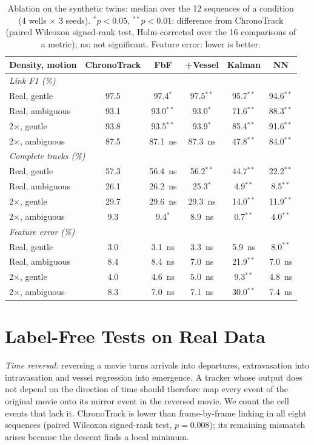 \documentclass[onecolumn,10pt]{IEEEtran}
\begin{document}
\begin{table}[h]
\centering
\caption{Ablation on the synthetic twins: median over the 12 sequences of a condition (4 wells $\times$ 3 seeds). $^{*}p<0.05$, $^{**}p<0.01$: difference from ChronoTrack (paired Wilcoxon signed-rank test, Holm-corrected over the 16 comparisons of a metric); ns: not significant. Feature error: lower is better.}
\label{tab:ablation}
\begin{tabular}{lccccc}
\toprule
Density, motion & ChronoTrack & FbF & +Vessel & Kalman & NN \\
\midrule
\multicolumn{6}{l}{\emph{Link F1 (\%)}} \\
Real, gentle & 97.5 & 97.4$^{*}$ & 97.5$^{**}$ & 95.7$^{**}$ & 94.6$^{**}$ \\
Real, ambiguous & 93.1 & 93.0$^{**}$ & 93.0$^{*}$ & 71.6$^{**}$ & 88.3$^{**}$ \\
2$\times$, gentle & 93.8 & 93.5$^{**}$ & 93.9$^{*}$ & 85.4$^{**}$ & 91.6$^{**}$ \\
2$\times$, ambiguous & 87.5 & 87.1~ns & 87.3~ns & 47.8$^{**}$ & 84.0$^{**}$ \\
\midrule
\multicolumn{6}{l}{\emph{Complete tracks (\%)}} \\
Real, gentle & 57.3 & 56.4~ns & 56.2$^{**}$ & 44.7$^{**}$ & 22.2$^{**}$ \\
Real, ambiguous & 26.1 & 26.2~ns & 25.3$^{*}$ & 4.9$^{**}$ & 8.5$^{**}$ \\
2$\times$, gentle & 29.7 & 29.6~ns & 29.3~ns & 14.0$^{**}$ & 11.9$^{**}$ \\
2$\times$, ambiguous & 9.3 & 9.4$^{*}$ & 8.9~ns & 0.7$^{**}$ & 4.0$^{**}$ \\
\midrule
\multicolumn{6}{l}{\emph{Feature error (\%)}} \\
Real, gentle & 3.0 & 3.1~ns & 3.3~ns & 5.9~ns & 8.0$^{**}$ \\
Real, ambiguous & 8.4 & 8.4~ns & 7.0~ns & 21.9$^{**}$ & 7.0~ns \\
2$\times$, gentle & 4.0 & 4.6~ns & 5.0~ns & 9.3$^{**}$ & 4.8~ns \\
2$\times$, ambiguous & 8.3 & 7.0~ns & 7.1~ns & 30.0$^{**}$ & 7.4~ns \\
\bottomrule
\end{tabular}
\end{table}

\section{Label-Free Tests on Real Data}\label{sec:labelfree}
\emph{Time reversal:} reversing a movie turns arrivals into departures, extravasation into intravasation and vessel regression into emergence. A tracker whose output does not depend on the direction of time should therefore map every event of the original movie onto its mirror event in the reversed movie. We count the cell events that lack it. ChronoTrack is lower than frame-by-frame linking in all eight sequences (paired Wilcoxon signed-rank test, $p=0.008$); its remaining mismatch arises because the descent finds a local minimum.
\end{document}
